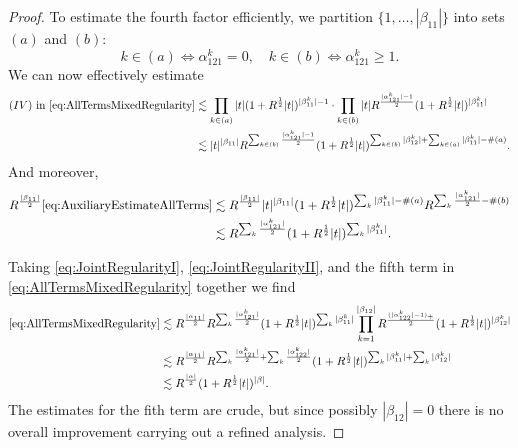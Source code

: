 \documentclass{amsart}
\theoremstyle{definition}
\begin{document}
\begin{proof}
To estimate the fourth factor efficiently, we partition $ \{ 1, \ldots, |\beta_{11}| \}$ into sets $(a)$ and $(b)$:
\begin{equation*}
k \in (a) \Leftrightarrow \alpha_{121}^k = 0, \quad k \in (b) \Leftrightarrow \alpha_{121}^k \geq 1. 
\end{equation*}
We can now effectively estimate
\begin{equation}
\label{eq:AuxiliaryEstimateAllTerms}
\begin{split}
(IV) \text{ in } \eqref{eq:AllTermsMixedRegularity} &\lesssim \prod_{k \in (a)} |t| (1+R^{\frac{1}{2}} |t|)^{|\beta_{11}^k| - 1} \cdot \prod_{k \in (b)} |t| R^{\frac{|\alpha_{121}^k|-1}{2}} (1+ R^{\frac{1}{2}} |t|)^{|\beta_{11}^k|} \\
&\lesssim |t|^{|\beta_{11}|} R^{\sum_{k \in (b)} \frac{|\alpha_{121}^k| - 1}{2}} (1+ R^{\frac{1}{2}} |t|)^{\sum_{k \in (b)} |\beta_{12}^k| + \sum_{k \in (a)} |\beta_{11}^k| - \# (a)}.
\end{split}
\end{equation}
And moreover,
\begin{equation}
\label{eq:JointRegularityII}
\begin{split}
R^{\frac{|\beta_{11}|}{2}} \eqref{eq:AuxiliaryEstimateAllTerms} &\lesssim R^{\frac{|\beta_{11}|}{2}} |t|^{|\beta_{11}|} (1 + R^{\frac{1}{2}} |t|)^{\sum_k |\beta^k_{11}| - \# (a)} R^{\sum_k \frac{|\alpha_{121}^k|}{2} - \# (b)} \\
&\lesssim R^{\sum_k \frac{|\alpha_{121}^k|}{2}} (1+R^{\frac{1}{2}} |t|)^{\sum_k |\beta_{11}^k|}.
\end{split}
\end{equation}

Taking \eqref{eq:JointRegularityI}, \eqref{eq:JointRegularityII}, and the fifth term in \eqref{eq:AllTermsMixedRegularity} together we find
\begin{equation*}
\begin{split}
\eqref{eq:AllTermsMixedRegularity} &\lesssim R^{\frac{|\alpha_{11}|}{2}} R^{\sum_k \frac{|\alpha_{121}^k|}{2}} (1+R^{\frac{1}{2}} |t|)^{\sum_{k} |\beta_{11}^k|} \prod_{k=1}^{|\beta_{12}|} R^{\frac{(|\alpha_{122}^k|-1)_+}{2}} (1+ R^{\frac{1}{2}} |t|)^{|\beta_{12}^k|} \\
&\lesssim R^{\frac{|\alpha_{11}|}{2}} R^{\sum_k \frac{|\alpha_{121}^k|}{2} + \sum_k \frac{|\alpha_{122}^k|}{2}} (1+ R^{\frac{1}{2}} |t|)^{\sum_k |\beta_{11}^k| + \sum_k |\beta_{12}^k|} \\
&\lesssim R^{\frac{|\alpha|}{2}} (1+ R^{\frac{1}{2}}|t|)^{|\beta|}.
\end{split}
\end{equation*}
The estimates for the fith term are crude, but since possibly $|\beta_{12}| = 0$ there is no overall improvement carrying out a refined analysis.
\end{proof}
\end{document}
